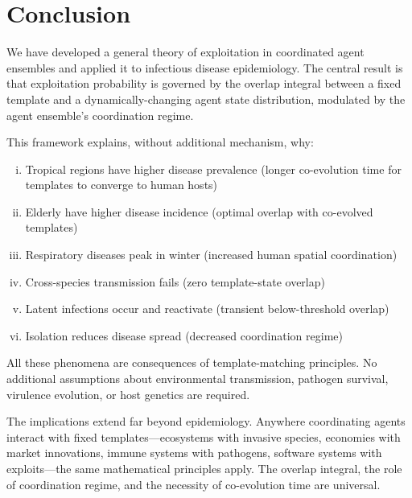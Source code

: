 \documentclass[11pt,twocolumn,a4paper]{article}
\begin{document}
\section{Conclusion}
\label{sec:conclusion}

We have developed a general theory of exploitation in coordinated agent ensembles and applied it to infectious disease epidemiology. The central result is that exploitation probability is governed by the overlap integral between a fixed template and a dynamically-changing agent state distribution, modulated by the agent ensemble's coordination regime.

This framework explains, without additional mechanism, why:
\begin{enumerate}[(i)]
\item Tropical regions have higher disease prevalence (longer co-evolution time for templates to converge to human hosts)
\item Elderly have higher disease incidence (optimal overlap with co-evolved templates)
\item Respiratory diseases peak in winter (increased human spatial coordination)
\item Cross-species transmission fails (zero template-state overlap)
\item Latent infections occur and reactivate (transient below-threshold overlap)
\item Isolation reduces disease spread (decreased coordination regime)
\end{enumerate}

All these phenomena are consequences of template-matching principles. No additional assumptions about environmental transmission, pathogen survival, virulence evolution, or host genetics are required.

The implications extend far beyond epidemiology. Anywhere coordinating agents interact with fixed templates—ecosystems with invasive species, economies with market innovations, immune systems with pathogens, software systems with exploits—the same mathematical principles apply. The overlap integral, the role of coordination regime, and the necessity of co-evolution time are universal.



\end{document}
